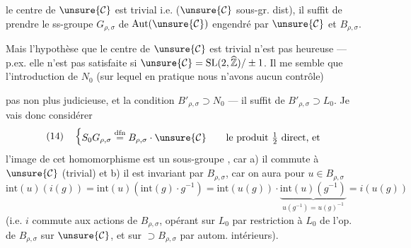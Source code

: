  le centre de $\unsure{\mathcal{C}}$ est trivial i.e.
($\unsure{\mathcal{C}}$ sous-gr. dist),
il suffit de prendre le ss-groupe $G_{\rho,\sigma}$ de $\mathrm{Aut}(\unsure{\mathcal{C}})$ engendré par $\unsure{\mathcal{C}}$ et $B_{\rho,\sigma}$.

Mais l'hypothèse que le centre de $\unsure{\mathcal{C}}$ est trivial n'est pas heureuse --- p.ex. elle n'est pas satisfaite si $\unsure{\mathcal{C}}=\mathrm{SL}(2,\widehat{\mathbb Z})/\pm1$.
Il me semble que l'introduction de $N_0$ (sur lequel en pratique nous n'avons aucun contrôle)

 pas non plus judicieuse, et  la condition $B'_{\rho,\sigma}\supset N_0$ --- il suffit de $B'_{\rho,\sigma}\supset L_0$.
Je vais donc considérer
\[
(14)\quad\left\{\begin{gathered}
S_0G_{\rho,\sigma}\overset{\mathrm{dfn}}{=}B_{\rho,\sigma}\cdot\unsure{\mathcal{C}}\qquad\text{le produit }\tfrac12\text{ direct, et}
\end{gathered}\right.
\]
l'image de cet homomorphisme est un sous-groupe , car a) il commute à $\unsure{\mathcal{C}}$ (trivial) et b) il est invariant par $B_{\rho,\sigma}$, car on aura pour $u\in B_{\rho,\sigma}$
\[
\mathrm{int}(u)(i(g))=\mathrm{int}(u)(\mathrm{int}(g)\cdot g^{-1})
=\mathrm{int}(u(g))\cdot\underbrace{\mathrm{int}(u)(g^{-1})}_{u(g^{-1})=u(g)^{-1}}
=i(u(g))
\]
(i.e. $i$ commute aux actions de $B_{\rho,\sigma}$, opérant sur $L_0$ par restriction à $L_0$ de l'op.  de $B_{\rho,\sigma}$ sur $\unsure{\mathcal{C}}$, et sur  $\supset B_{\rho,\sigma}$ par autom. intérieurs).

